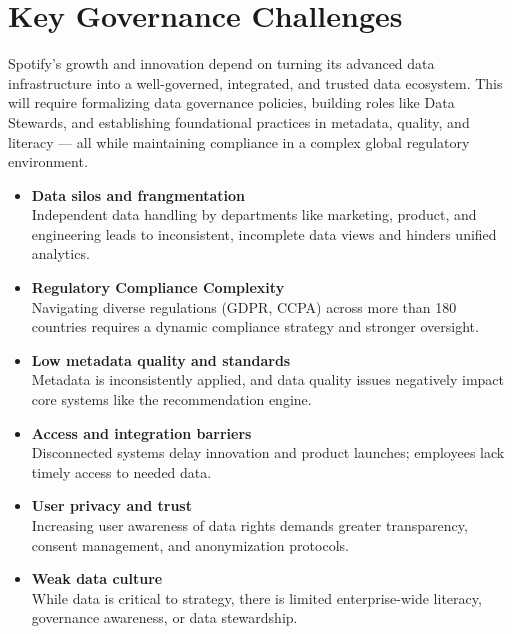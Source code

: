 \documentclass[11pt,a4paper,computermodern]{article}
\begin{document}
\section*{Key Governance Challenges}

Spotify's growth and innovation depend on turning its advanced data infrastructure into a well-governed, integrated, and trusted data ecosystem. This will require formalizing data governance policies, building roles like Data Stewards, and establishing foundational practices in metadata, quality, and literacy — all while maintaining compliance in a complex global regulatory environment.

\begin{itemize}
	\item \textbf{Data silos and frangmentation}\\
	Independent data handling by departments like marketing, product, and engineering leads to inconsistent, incomplete data views and hinders unified analytics.
	\item \textbf{Regulatory Compliance Complexity}\\
	Navigating diverse regulations (GDPR, CCPA) across more than 180 countries requires a dynamic compliance strategy and stronger oversight.
	\item \textbf{Low metadata quality and standards}\\
	Metadata is inconsistently applied, and data quality issues negatively impact core systems like the recommendation engine.
	\item \textbf{Access and integration barriers}\\
	Disconnected systems delay innovation and product launches; employees lack timely access to needed data.
	\item \textbf{User privacy and trust}\\
	Increasing user awareness of data rights demands greater transparency, consent management, and anonymization protocols.
	\item \textbf{Weak data culture}\\
	While data is critical to strategy, there is limited enterprise-wide literacy, governance awareness, or data stewardship.
\end{itemize}
\end{document}

